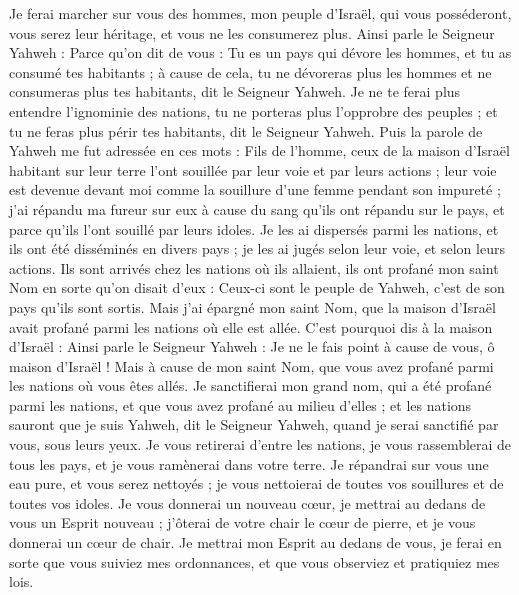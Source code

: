 \begin{multicols}{2}
Je ferai marcher sur vous des hommes, mon peuple d'Israël, qui vous posséderont, vous serez leur héritage, et vous ne les consumerez plus.
Ainsi parle le Seigneur Yahweh : Parce qu'on dit de vous : Tu es un pays qui dévore les hommes, et tu as consumé tes habitants ;
à cause de cela, tu ne dévoreras plus les hommes et ne consumeras plus tes habitants, dit le Seigneur Yahweh.
Je ne te ferai plus entendre l'ignominie des nations, tu ne porteras plus l'opprobre des peuples ; et tu ne feras plus périr tes habitants, dit le Seigneur Yahweh.
Puis la parole de Yahweh me fut adressée en ces mots :
Fils de l’homme, ceux de la maison d'Israël habitant sur leur terre l'ont souillée par leur voie et par leurs actions ; leur voie est devenue devant moi comme la souillure d’une femme pendant son impureté ;
j'ai répandu ma fureur sur eux à cause du sang qu'ils ont répandu sur le pays, et parce qu'ils l'ont souillé par leurs idoles.
Je les ai dispersés parmi les nations, et ils ont été disséminés en divers pays ; je les ai jugés selon leur voie, et selon leurs actions.
Ils sont arrivés chez les nations où ils allaient, ils ont profané mon saint Nom en sorte qu’on disait d’eux : Ceux-ci sont le peuple de Yahweh, c’est de son pays qu’ils sont sortis.
Mais j'ai épargné mon saint Nom, que la maison d'Israël avait profané parmi les nations où elle est allée.
C'est pourquoi dis à la maison d'Israël : Ainsi parle le Seigneur Yahweh : Je ne le fais point à cause de vous, ô maison d'Israël ! Mais à cause de mon saint Nom, que vous avez profané parmi les nations où vous êtes allés.
Je sanctifierai mon grand nom, qui a été profané parmi les nations, et que vous avez profané au milieu d’elles ; et les nations sauront que je suis Yahweh, dit le Seigneur Yahweh, quand je serai sanctifié par vous, sous leurs yeux.
Je vous retirerai d'entre les nations, je vous rassemblerai de tous les pays, et je vous ramènerai dans votre terre.
Je répandrai sur vous une eau pure, et vous serez nettoyés ; je vous nettoierai de toutes vos souillures et de toutes vos idoles.
Je vous donnerai un nouveau cœur, je mettrai au dedans de vous un Esprit nouveau ; j'ôterai de votre chair le cœur de pierre, et je vous donnerai un cœur de chair.
Je mettrai mon Esprit au dedans de vous, je ferai en sorte que vous suiviez mes ordonnances, et que vous observiez et pratiquiez mes lois.

\end{multicols}
